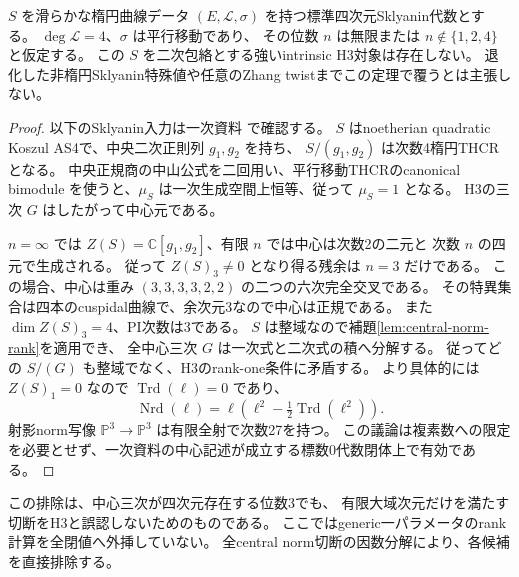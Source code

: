 \begin{theorem}[proper楕円四次元Sklyanin包絡の排除]
\label{thm:sklyanin-no-H3}
$S$ を滑らかな楕円曲線データ $(E,\mathcal L,\sigma)$ を持つ標準四次元Sklyanin代数とする。
$\deg\mathcal L=4$、$\sigma$ は平行移動であり、
その位数 $n$ は無限または $n\notin\{1,2,4\}$ と仮定する。
この $S$ を二次包絡とする強いintrinsic H3対象は存在しない。
退化した非楕円Sklyanin特殊値や任意のZhang twistまでこの定理で覆うとは主張しない。
\end{theorem}
\begin{proof}
以下のSklyanin入力は一次資料
\cite[Lemma 2.9, Propositions 2.11, 2.12, 2.18, Theorem 3.13]{WWYSklyanin4}で確認する。
$S$ はnoetherian quadratic Koszul AS4で、中央二次正則列 $g_1,g_2$ を持ち、
$S/(g_1,g_2)$ は次数4楕円THCRとなる。
中央正規商の中山公式を二回用い、平行移動THCRのcanonical bimodule
\cite[Example 7.16]{YeTHCR}を使うと、$\mu_S$ は一次生成空間上恒等、従って $\mu_S=1$ となる。
H3の三次 $G$ はしたがって中心元である。

$n=\infty$ では $Z(S)=\mathbb C[g_1,g_2]$、有限 $n$ では中心は次数2の二元と
次数 $n$ の四元で生成される。
従って $Z(S)_3\ne0$ となり得る残余は $n=3$ だけである。
この場合、中心は重み $(3,3,3,3,2,2)$ の二つの六次完全交叉である。
その特異集合は四本のcuspidal曲線で、余次元3なので中心は正規である。
また $\dim Z(S)_3=4$、PI次数は3である。
$S$ は整域なので補題\ref{lem:central-norm-rank}を適用でき、
全中心三次 $G$ は一次式と二次式の積へ分解する。
従ってどの $S/(G)$ も整域でなく、H3のrank-one条件に矛盾する。
より具体的には $Z(S)_1=0$ なので $\operatorname{Trd}(\ell)=0$ であり、
\[
 \operatorname{Nrd}(\ell)
   =\ell\left(\ell^2-\tfrac12\operatorname{Trd}(\ell^2)\right).
\]
射影norm写像 $\mathbb P^3\to\mathbb P^3$ は有限全射で次数27を持つ。
この議論は複素数への限定を必要とせず、一次資料の中心記述が成立する標数0代数閉体上で有効である。
\end{proof}

この排除は、中心三次が四次元存在する位数3でも、
有限大域次元だけを満たす切断をH3と誤認しないためのものである。
ここではgeneric一パラメータのrank計算を全閉値へ外挿していない。
全central norm切断の因数分解により、各候補を直接排除する。

